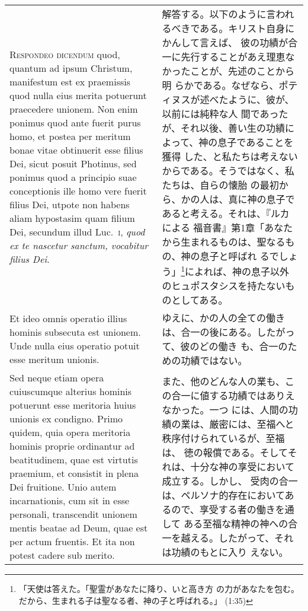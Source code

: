 \documentclass[10pt]{jsarticle} %
\begin{document}
\begin{longtable}{p{21em}p{21em}}
\\



{\scshape Respondeo dicendum} quod, quantum ad ipsum Christum,
manifestum est ex praemissis quod nulla eius merita potuerunt
praecedere unionem. Non enim ponimus quod ante fuerit purus homo, et
postea per meritum bonae vitae obtinuerit esse filius Dei, sicut
posuit Photinus, sed ponimus quod a principio suae conceptionis ille
homo vere fuerit filius Dei, utpote non habens aliam hypostasim quam
filium Dei, secundum illud Luc.~{\scshape i}, {\itshape quod ex te
nascetur sanctum, vocabitur filius Dei}.


&

解答する。以下のように言われるべきである。キリスト自身にかんして言えば、
彼の功績が合一に先行することがあえ理恵なかったことが、先述のことから明
らかである。なぜなら、ポティヌスが述べたように、彼が、以前には純粋な人
間であったが、それ以後、善い生の功績によって、神の息子であることを獲得
した、と私たちは考えないからである。そうではなく、私たちは、自らの懐胎
の最初から、かの人は、真に神の息子であると考える。それは、『ルカによる
福音書』第1章「あなたから生まれるものは、聖なるもの、神の息子と呼ばれ
るでしょう」\footnote{「天使は答えた。「聖霊があなたに降り、いと高き方
の力があなたを包む。だから、生まれる子は聖なる者、神の子と呼ばれる。」
(1:35) }によれば、神の息子以外のヒュポスタシスを持たないものとしてある。

\\


Et ideo omnis operatio illius hominis subsecuta est unionem. Unde
nulla eius operatio potuit esse meritum unionis.

&

ゆえに、かの人の全ての働きは、合一の後にある。したがって、彼のどの働き
も、合一のための功績ではない。


\\


Sed neque etiam opera cuiuscumque alterius hominis potuerunt esse
meritoria huius unionis ex condigno.  Primo quidem, quia opera
meritoria hominis proprie ordinantur ad beatitudinem, quae est
virtutis praemium, et consistit in plena Dei fruitione. Unio autem
incarnationis, cum sit in esse personali, transcendit unionem mentis
beatae ad Deum, quae est per actum fruentis. Et ita non potest cadere
sub merito.


&

また、他のどんな人の業も、この合一に値する功績ではありえなかった。一つ
には、人間の功績の業は、厳密には、至福へと秩序付けられているが、至福は、
徳の報償である。そしてそれは、十分な神の享受において成立する。しかし、
受肉の合一は、ペルソナ的存在においてあるので、享受する者の働きを通して
ある至福な精神の神への合一を越える。したがって、それは功績のもとに入り
えない。



\end{longtable}
\end{document}
